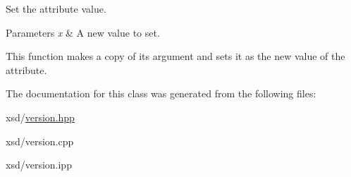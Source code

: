 Set the attribute value. 


\begin{DoxyParams}{Parameters}
{\em x} & A new value to set.\\
\hline
\end{DoxyParams}
This function makes a copy of its argument and sets it as the new value of the attribute. 

The documentation for this class was generated from the following files:\begin{DoxyCompactItemize}
\item 
xsd/\hyperlink{version_8hpp}{version.hpp}\item 
xsd/version.cpp\item 
xsd/version.ipp\end{DoxyCompactItemize}
